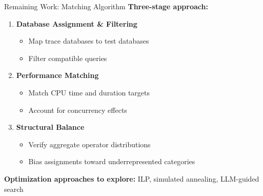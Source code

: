 \documentclass[aspectratio=169]{beamer}
\begin{document}
\begin{frame}{Remaining Work: Matching Algorithm}
    \textbf{Three-stage approach:}
    
    \vspace{0.2cm}
    \begin{enumerate}
        \item \textbf{Database Assignment \& Filtering}
        \begin{itemize}
            \item Map trace databases to test databases
            \item Filter compatible queries
        \end{itemize}
        
        \vspace{0.2cm}
        \item \textbf{Performance Matching}
        \begin{itemize}
            \item Match CPU time and duration targets
            \item Account for concurrency effects
        \end{itemize}
        
        \vspace{0.2cm}
        \item \textbf{Structural Balance}
        \begin{itemize}
            \item Verify aggregate operator distributions
            \item Bias assignments toward underrepresented categories
        \end{itemize}
    \end{enumerate}
    
    \vspace{0.3cm}
    \textbf{Optimization approaches to explore:} ILP, simulated annealing, LLM-guided search
\end{frame}
\end{document}
